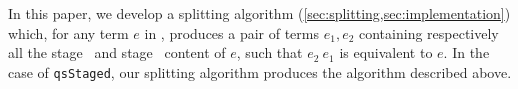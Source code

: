 In this paper, we develop a splitting algorithm
(\ref{sec:splitting,sec:implementation}) which, for any term $e$ in \lang,
produces a pair of terms $e_1,e_2$ containing respectively all the stage \bbone\
and stage \bbtwo\ content of $e$, such that $e_2~e_1$ is equivalent to $e$. In
the case of \texttt{qsStaged}, our splitting algorithm produces the algorithm
described above.





